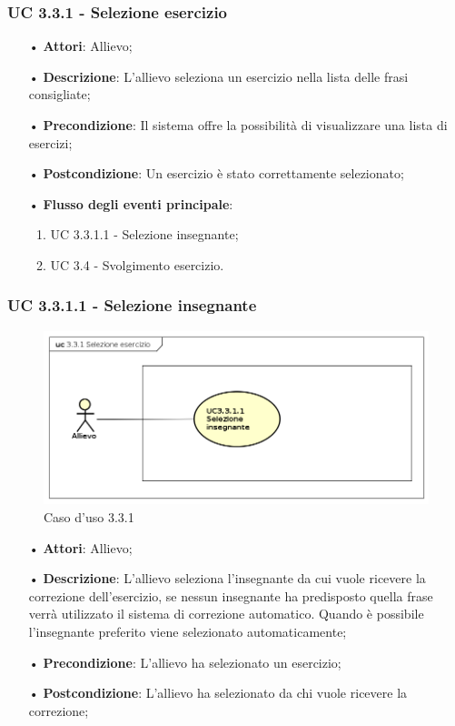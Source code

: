 \subsubsection{UC 3.3.1 - Selezione esercizio}
\begin{itemize}
\item[•]\textbf{Attori}: Allievo;
\item[•]\textbf{Descrizione}: L’allievo seleziona un esercizio nella lista delle frasi consigliate;
\item[•]\textbf{Precondizione}: Il sistema offre la possibilità di visualizzare una lista di esercizi;
\item[•]\textbf{Postcondizione}: Un esercizio è stato correttamente selezionato;
\item[•]\textbf{Flusso degli eventi principale}:
\begin{enumerate}
\item UC 3.3.1.1 - Selezione insegnante;
\item UC 3.4 - Svolgimento esercizio.
\end{enumerate}
\end{itemize}

\subsubsection{UC 3.3.1.1 - Selezione insegnante}\begin{figure}[H]
\centering
\includegraphics[width=17cm]{img/UC331.png} 
\caption{Caso d'uso 3.3.1}\label{fig:331}
\end{figure}
\begin{itemize}
\item[•]\textbf{Attori}: Allievo;
\item[•]\textbf{Descrizione}: L’allievo seleziona l’insegnante da cui vuole ricevere la correzione dell’esercizio, se nessun insegnante ha predisposto quella frase verrà utilizzato il sistema di correzione automatico. Quando è possibile l’insegnante preferito viene selezionato automaticamente;
\item[•]\textbf{Precondizione}: L’allievo ha selezionato un esercizio;
\item[•]\textbf{Postcondizione}: L’allievo ha selezionato da chi vuole ricevere la correzione;
\end{itemize}


